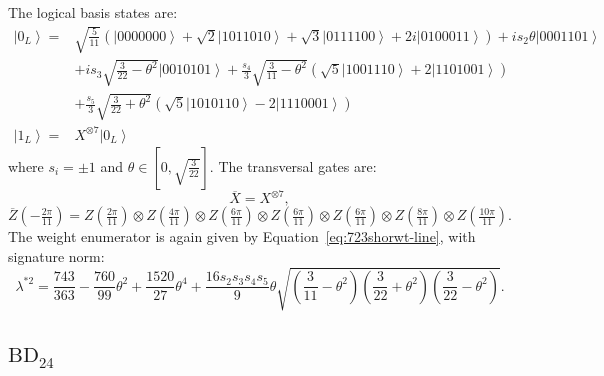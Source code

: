 \documentclass[8pt]{article}
\theoremstyle{definition}
\begin{document}
The logical basis states are:
\begin{align*}
    \left|0_{L}\right\rangle = & \sqrt{\frac{5}{11}}\left(\left|0000000\right\rangle +\sqrt{2}\left|1011010\right\rangle +\sqrt{3}\left|0111100\right\rangle +2i\left|0100011\right\rangle \right)+is_{2}\theta\left|0001101\right\rangle \\
                               & +is_{3}\sqrt{\frac{3}{22}-\theta^{2}}\left|0010101\right\rangle +\frac{s_{4}}{3}\sqrt{\frac{3}{11}-\theta^{2}}\left(\sqrt{5}\left|1001110\right\rangle +2\left|1101001\right\rangle \right)              \\
                               & +\frac{s_{5}}{3}\sqrt{\frac{3}{22}+\theta^{2}}\left(\sqrt{5}\left|1010110\right\rangle -2\left|1110001\right\rangle \right)                                                                              \\
    \left|1_{L}\right\rangle = & X^{\otimes7}\left|0_{L}\right\rangle
\end{align*}
where $s_i=\pm 1$ and $\theta\in\left[0,\sqrt{\tfrac{3}{22}}\right]$. The transversal gates are:
\[ \overline{X}=X^{\otimes7}, \]
\[ \overline{Z}\left(-\tfrac{2\pi}{11}\right)=Z\left(\tfrac{2\pi}{11}\right)\otimes Z\left(\tfrac{4\pi}{11}\right)\otimes Z\left(\tfrac{6\pi}{11}\right)\otimes Z\left(\tfrac{6\pi}{11}\right)\otimes Z\left(\tfrac{6\pi}{11}\right)\otimes Z\left(\tfrac{8\pi}{11}\right)\otimes Z\left(\tfrac{10\pi}{11}\right). \]
The weight enumerator is again given by Equation~\eqref{eq:723shorwt-line}, with signature norm:
\[ \lambda^{*2}=\frac{743}{363}-\frac{760}{99}\theta^{2}+\frac{1520}{27}\theta^{4}+\frac{16s_{2}s_{3}s_{4}s_{5}}{9}\theta\sqrt{\left(\frac{3}{11}-\theta^{2}\right)\left(\frac{3}{22}+\theta^{2}\right)\left(\frac{3}{22}-\theta^{2}\right)}. \]

\subsection{\texorpdfstring{$\mathrm{BD}_{24}$}{BD₂₄}}
\end{document}
